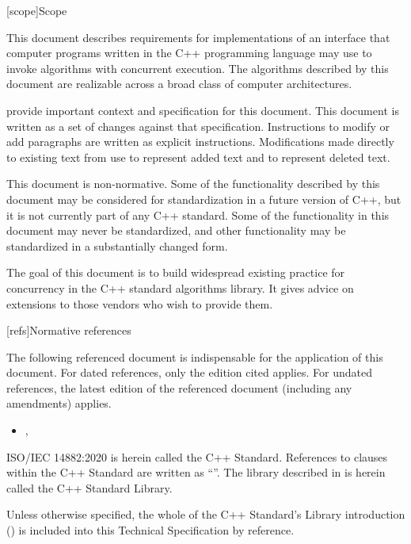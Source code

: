 
[scope]{Scope}

\pnum
This document describes requirements for implementations of an interface that computer programs written in the C++ programming language may use to invoke algorithms with concurrent execution. The algorithms described by this document are realizable across a broad class of computer architectures.

\pnum
{\cppstddocno} provide important context and specification for
this document. This document is written as a set of changes against that specification.  Instructions to modify or add paragraphs are written as
explicit instructions.  Modifications made directly to existing text from {\cppstddocno} use  to represent added text and  to represent deleted text.

\pnum
This document is non-normative. Some of the functionality described by this document may be considered for standardization in a future version of C++, but it is not currently part of any C++ standard. Some of the functionality in this document may never be standardized, and other functionality may be standardized in a substantially changed form.

\pnum
The goal of this document is to build widespread existing practice for concurrency in the C++ standard algorithms library. It gives advice on extensions to those vendors who wish to provide them.

[refs]{Normative references}

\pnum
The following referenced document is indispensable for the application of this document. For dated references, only the edition cited applies. For undated references, the latest edition of the referenced document (including any amendments) applies.

\begin{itemize}
\item {\cppstddocno}, 
\end{itemize}

\pnum
ISO/IEC 14882:2020 is herein called the C++ Standard. References to clauses within the C++ Standard are written as ``''. The library described in  is herein called the C++ Standard Library.

\pnum
Unless otherwise specified, the whole of the C++ Standard's Library introduction () is included into this Technical Specification by reference.


